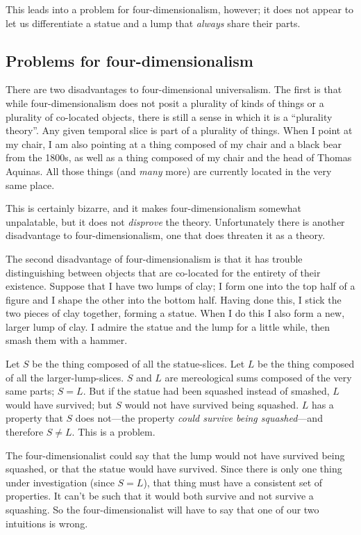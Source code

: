 \documentclass[12pt,twoside]{reedfancy}
\begin{document}
\begin{spacing}{1.25}
This leads into a problem for four-dimensionalism, however; it does
not appear to let us differentiate a statue and a lump that {\em
  always} share their parts.

\subsection{Problems for four-dimensionalism}
\label{4dp}
There are two disadvantages to four-dimensional universalism.  The
first is that while four-dimensionalism does not posit a plurality of
kinds of things or a plurality of co-located objects, there is still a
sense in which it is a ``plurality theory''.  Any given temporal slice
is part of a plurality of things.  When I point at my chair, I am also
pointing at a thing composed of my chair and a black bear from the
1800s, as well as a thing composed of my chair and the head of Thomas
Aquinas.  All those things (and {\em many} more) are currently located
in the very same place.

This is certainly bizarre, and it makes four-dimensionalism somewhat
unpalatable, but it does not {\em disprove} the theory.  Unfortunately
there is another disadvantage to four-dimensionalism, one that does
threaten it as a theory.

The second disadvantage of four-dimensionalism is that it has trouble
distinguishing between objects that are co-located for the entirety of
their existence.  Suppose that I have two lumps of clay; I form one
into the top half of a figure and I shape the other into the bottom
half.  Having done this, I stick the two pieces of clay together,
forming a statue.  When I do this I also form a new, larger lump of
clay.  I admire the statue and the lump for a little while, then smash
them with a hammer.

Let $S$ be the thing composed of all the statue-slices.  Let $L$ be
the thing composed of all the larger-lump-slices.  $S$ and $L$ are
mereological sums composed of the very same parts; $S = L$.  But if
the statue had been squashed instead of smashed, $L$ would have
survived; but $S$ would not have survived being squashed.  $L$ has a
property that $S$ does not---the property {\em could survive being
  squashed}---and therefore $S \neq L$.  This is a problem.

The four-dimensionalist could say that the lump would not have
survived being squashed, or that the statue would have survived.
Since there is only one thing under investigation (since $S = L$),
that thing must have a consistent set of properties.  It can't be such
that it would both survive and not survive a squashing.  So the
four-dimensionalist will have to say that one of our two intuitions is
wrong.


\end{spacing}
\end{document}
